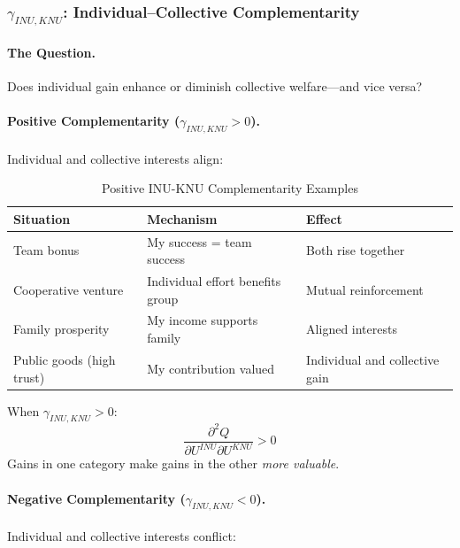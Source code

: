 \subsubsection{$\gamma_{INU,KNU}$: Individual--Collective Complementarity}

\paragraph{The Question.}
Does individual gain enhance or diminish collective welfare---and vice versa?

\paragraph{Positive Complementarity ($\gamma_{INU,KNU} > 0$).}
Individual and collective interests align:

\begin{table}[htbp]
\centering
\caption{Positive INU-KNU Complementarity Examples}
\label{tab:inu-knu-positive}
\renewcommand{\arraystretch}{1.3}
\begin{tabular}{@{}lll@{}}
\toprule
\textbf{Situation} & \textbf{Mechanism} & \textbf{Effect} \\
\midrule
Team bonus & My success = team success & Both rise together \\
Cooperative venture & Individual effort benefits group & Mutual reinforcement \\
Family prosperity & My income supports family & Aligned interests \\
Public goods (high trust) & My contribution valued & Individual and collective gain \\
\bottomrule
\end{tabular}
\end{table}

When $\gamma_{INU,KNU} > 0$:
\begin{equation}
\frac{\partial^2 Q}{\partial U^{INU} \partial U^{KNU}} > 0
\end{equation}
Gains in one category make gains in the other \emph{more valuable}.

\paragraph{Negative Complementarity ($\gamma_{INU,KNU} < 0$).}
Individual and collective interests conflict:

